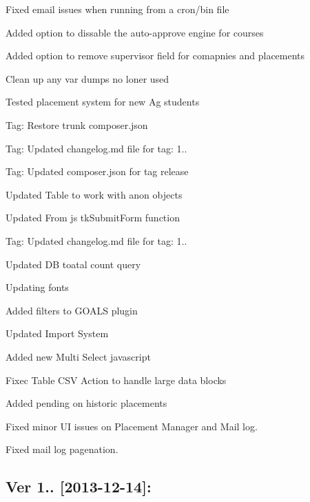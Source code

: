 \begin{DoxyItemize}
\item Fixed email issues when running from a cron/bin file
\item Added option to dissable the auto-\/approve engine for courses
\item Added option to remove supervisor field for comapnies and placements
\item Clean up any var dumps no loner used
\item Tested placement system for new Ag students
\item Tag\+: Restore trunk composer.\+json
\item Tag\+: Updated changelog.\+md file for tag\+: 1..
\item Tag\+: Updated composer.\+json for tag release
\item Updated Table to work with anon objects
\item Updated From js tk\+Submit\+Form function
\item Tag\+: Updated changelog.\+md file for tag\+: 1..
\item Updated D\+B toatal count query
\item Updating fonts
\item Added filters to G\+O\+A\+L\+S plugin
\item Updated Import System
\item Added new Multi Select javascript
\item Fixec Table C\+S\+V Action to handle large data blocks
\item Added pending on historic placements
\item Fixed minor U\+I issues on Placement Manager and Mail log.
\item Fixed mail log pagenation.
\end{DoxyItemize}

\subsection*{Ver 1.. \mbox{[}2013-\/12-\/14\mbox{]}\+: }


